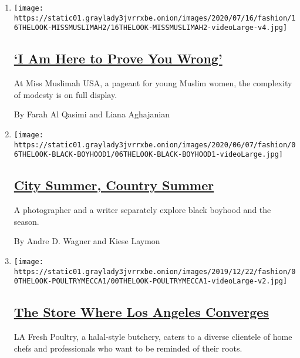 \begin{enumerate}
\def\labelenumi{\arabic{enumi}.}
\item
  \texttt{[image: https://static01.graylady3jvrrxbe.onion/images/2020/07/16/fashion/16THELOOK-MISSMUSLIMAH2/16THELOOK-MISSMUSLIMAH2-videoLarge-v4.jpg]}

  \hypertarget{i-am-here-to-prove-you-wrong}{%
  \subsection{\texorpdfstring{\href{/2020/07/04/style/muslim-beauty-pageant-miss-muslimah-usa.html}{`I
  Am Here to Prove You
  Wrong'}}{`I Am Here to Prove You Wrong'}}\label{i-am-here-to-prove-you-wrong}}

  At Miss Muslimah USA, a pageant for young Muslim women, the complexity
  of modesty is on full display.

  By Farah Al Qasimi and Liana Aghajanian
\item
  \texttt{[image: https://static01.graylady3jvrrxbe.onion/images/2020/06/07/fashion/06THELOOK-BLACK-BOYHOOD1/06THELOOK-BLACK-BOYHOOD1-videoLarge.jpg]}

  \hypertarget{city-summer-country-summer}{%
  \subsection{\texorpdfstring{\href{/2020/06/06/style/city-summer-country-summer.html}{City
  Summer, Country
  Summer}}{City Summer, Country Summer}}\label{city-summer-country-summer}}

  A photographer and a writer separately explore black boyhood and the
  season.

  By Andre D. Wagner and Kiese Laymon
\item
  \texttt{[image: https://static01.graylady3jvrrxbe.onion/images/2019/12/22/fashion/00THELOOK-POULTRYMECCA1/00THELOOK-POULTRYMECCA1-videoLarge-v2.jpg]}

  \hypertarget{the-store-where-los-angeles-converges}{%
  \subsection{\texorpdfstring{\href{/2019/12/21/style/la-fresh-poultry-immigrant-family-recipes.html}{The
  Store Where Los Angeles
  Converges}}{The Store Where Los Angeles Converges}}\label{the-store-where-los-angeles-converges}}

  LA Fresh Poultry, a halal-style butchery, caters to a diverse
  clientele of home chefs and professionals who want to be reminded of
  their roots.


\end{enumerate}

